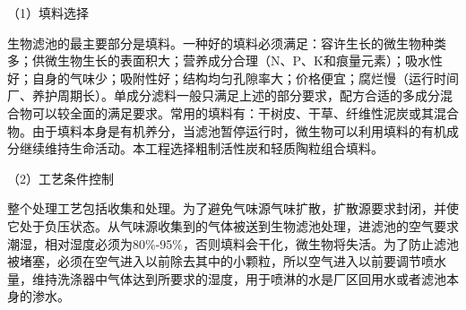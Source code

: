 （1）填料选择\par
生物滤池的最主要部分是填料。一种好的填料必须满足：容许生长的微生物种类多；供微生物生长的表面积大；营养成分合理（N、P、K和痕量元素）；吸水性好；自身的气味少；吸附性好；结构均匀孔隙率大；价格便宜；腐烂慢（运行时间厂、养护周期长）。单成分滤料一般只满足上述的部分要求，配方合适的多成分混合物可以较全面的满足要求。常用的填料有：干树皮、干草、纤维性泥炭或其混合物。由于填料本身是有机养分，当滤池暂停运行时，微生物可以利用填料的有机成分继续维持生命活动。本工程选择粗制活性炭和轻质陶粒组合填料。\par
（2）工艺条件控制\par
整个处理工艺包括收集和处理。为了避免气味源气味扩散，扩散源要求封闭，并使它处于负压状态。从气味源收集到的气体被送到生物滤池处理，进滤池的空气要求潮湿，相对湿度必须为80\%-95\%，否则填料会干化，微生物将失活。为了防止滤池被堵塞，必须在空气进入以前除去其中的小颗粒，所以空气进入以前要调节喷水量，维持洗涤器中气体达到所要求的湿度，用于喷淋的水是厂区回用水或者滤池本身的渗水。\par
